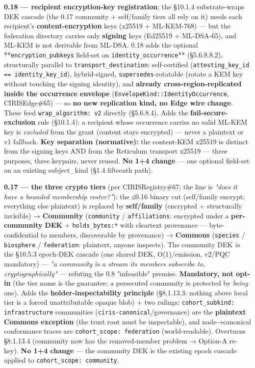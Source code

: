 \documentclass[11pt]{article}
\begin{document}
\textbf{0.18 — recipient encryption-key registration}: the §10.1.4 substrate-wraps DEK cascade (the 0.17 community + self/family tiers all rely on it) needs each recipient's \textbf{content-encryption} keys (x25519 + ML-KEM-768) — but the federation directory carries only \textbf{signing} keys (Ed25519 + ML-DSA-65), and ML-KEM is not derivable from ML-DSA. 0.18 adds the optional **\texttt{encryption\_pubkeys} field-set on \texttt{identity\_occurrence}** (§5.6.8.8.2), structurally parallel to \texttt{transport\_destination}: self-certified (\texttt{attesting\_key\_id == identity\_key\_id}), hybrid-signed, \texttt{supersedes}-rotatable (rotate a KEM key without touching the signing identity), and \textbf{already cross-region-replicated inside the occurrence envelope} (\texttt{EnvelopeKind::IdentityOccurrence}, CIRISEdge\#65) — so \textbf{no new replication kind, no Edge wire change}. These feed \texttt{wrap\_algorithm: v2} directly (§5.6.8.4). Adds the \textbf{fail-secure-exclusion} rule (§10.1.4): a recipient whose occurrence carries no valid ML-KEM key is \textit{excluded} from the grant (content stays encrypted) — never a plaintext or v1 fallback. \textbf{Key separation (normative):} the content-KEM x25519 is distinct from the signing keys AND from the Reticulum transport x25519 — three purposes, three keypairs, never reused. \textbf{No 1+4 change} — one optional field-set on an existing subject\_kind (§1.4 fifteenth path).


\textbf{0.17 — the three crypto tiers} (per CIRISRegistry\#67; the line is \textit{"does it have a bounded membership roster?"}): the ≤0.16 binary cut (self/family encrypt; everything else plaintext) is replaced by \textbf{self/family} (encrypted + structurally invisible) → \textbf{Community} (\texttt{community} / \texttt{affiliations}: encrypted under a \textbf{per-community DEK} + \texttt{holds\_bytes:*} with cleartext provenance — byte-confidential to members, discoverable by provenance) → \textbf{Commons} (\texttt{species} / \texttt{biosphere} / \texttt{federation}: plaintext, anyone inspects). The community DEK \textit{is} the §10.5.3 epoch-DEK cascade (one shared DEK, O(1)/emission, v2/PQC mandatory) — \textit{"a community is a stream its members subscribe to, cryptographically"} — refuting the 0.8 "infeasible" premise. \textbf{Mandatory, not opt-in} (the tier name is the guarantee; a persecuted community is protected by \textit{being} one). Adds the \textbf{holder-inspectability principle} (§8.1.13.3: nothing above local tier is a forced unattributable opaque blob) + two rulings: \texttt{cohort\_subkind: infrastructure} communities (\texttt{ciris-canonical}/governance) are the \textbf{plaintext Commons exception} (the trust root must be inspectable), and node→canonical conformance traces are \texttt{cohort\_scope: federation} (world-readable). Overturns §8.1.13.4 (community now has the removed-member problem → Option-A re-key). \textbf{No 1+4 change} — the community DEK is the existing epoch cascade applied to \texttt{cohort\_scope: community}.
\end{document}
